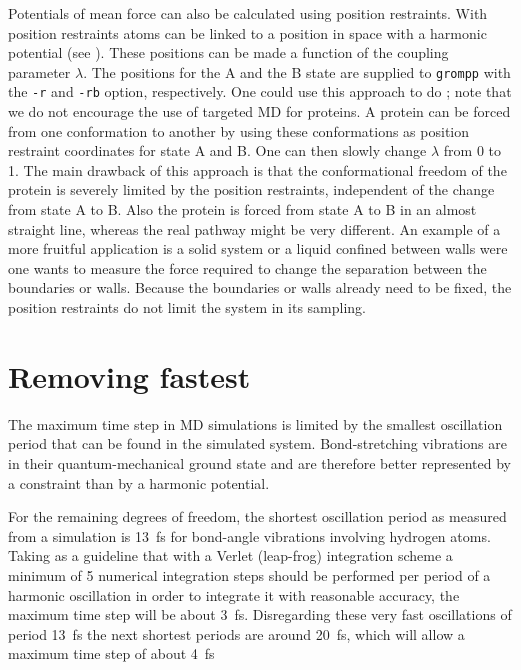 Potentials of mean force can also be calculated using position restraints.
With position restraints atoms can be linked to a position in space
with a harmonic potential (see ).
These positions can be made a function of the coupling parameter $\lambda$.
The positions for the A and the B state are supplied to {\tt grompp} with
the {\tt -r} and {\tt -rb} option, respectively.
One could use this approach to do ;
note that we do not encourage the use of targeted MD for proteins.
A protein can be forced from one conformation to another by using
these conformations as position restraint coordinates for state A and B.
One can then slowly change $\lambda$ from 0 to 1.
The main drawback of this approach is that the conformational freedom
of the protein is severely limited by the position restraints,
independent of the change from state A to B.
Also the protein is forced from state A to B in an almost straight line,
whereas the real pathway might be very different.
An example of a more fruitful application is a solid system or a liquid
confined between walls were one wants to measure the force required
to change the separation between the boundaries or walls.
Because the boundaries or walls already need to be fixed,
the position restraints do not limit the system in its sampling.

\newcommand{\amine}{\sf -NH$_2$}
\newcommand{\amines}{\sf -NH-}
\newcommand{\aminep}{\sf -NH$_3^+$}
\section{Removing fastest }
\label{sec:rmfast}
The maximum time step in MD simulations is limited by the smallest
oscillation period that can be found in the simulated
system. Bond-stretching vibrations are in their quantum-mechanical
ground state and are therefore better represented by a constraint than
by a harmonic potential.

For the remaining degrees of freedom, the shortest oscillation period
as measured from a simulation is 13~fs for bond-angle vibrations
involving hydrogen atoms. Taking as a guideline that with a Verlet
(leap-frog) integration scheme a minimum of 5 numerical integration
steps should be performed per period of a harmonic oscillation in
order to integrate it with reasonable accuracy, the maximum time step
will be about 3~fs. Disregarding these very fast oscillations of
period 13~fs the next shortest periods are around 20~fs, which will
allow a maximum time step of about 4~fs

